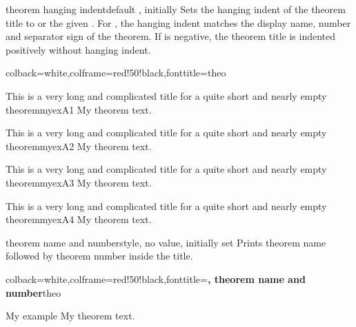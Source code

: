 \clearpage

\begin{docTcbKey}[][doc new=2020-10-21]{theorem hanging indent}{}{default , initially }
  Sets the hanging indent of the theorem title to  or the
  given .
  For , the hanging indent matches the display name, number and
  separator sign of the theorem.
  If  is negative, the theorem title is indented positively
  without hanging indent.

\begin{dispExample}
%
  {colback=white,colframe=red!50!black,fonttitle=\bfseries}{theo}

\begin{sometheorem}{This is a very long and complicated title for a quite
  short and nearly empty theorem}{myexA1}
My theorem text.
\end{sometheorem}

\begin{sometheorem}[theorem hanging indent=5mm]{This is a very long and
  complicated title for a quite short and nearly empty theorem}{myexA2}
My theorem text.
\end{sometheorem}

\begin{sometheorem}[theorem hanging indent=0pt]{This is a very long and
  complicated title for a quite short and nearly empty theorem}{myexA3}
My theorem text.
\end{sometheorem}

\begin{sometheorem}[theorem hanging indent=-5mm]{This is a very long and
  complicated title for a quite short and nearly empty theorem}{myexA4}
My theorem text.
\end{sometheorem}
\end{dispExample}
\end{docTcbKey}



\clearpage
\begin{docTcbKey}{theorem name and number}{}{style, no value, initially set}
Prints theorem name followed by theorem number inside the title.
\begin{dispExample}
%
  {colback=white,colframe=red!50!black,fonttitle=\bfseries,
   theorem name and number}{theo}
\begin{sometheorem}{My example}{}
My theorem text.
\end{sometheorem}
\end{dispExample}
\end{docTcbKey}



